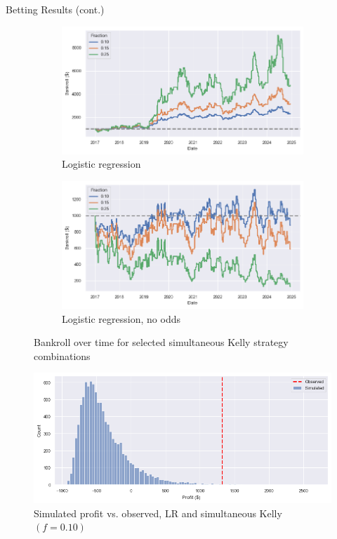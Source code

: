 \documentclass[aspectratio=169,xcolor=dvipsnames]{beamer}
\begin{document}
\begin{frame}{Betting Results (cont.)}
    \begin{figure}[!htb]
    \centering
    \captionsetup{justification=centering}
    \begin{subfigure}{.3\linewidth}
      \centering
      \includegraphics[width=\linewidth]{figures/bankroll_lr_simultaneous.png}
      \caption{Logistic regression}
    \end{subfigure}%
    \begin{subfigure}{.3\linewidth}
      \centering
      \includegraphics[width=\linewidth]{figures/bankroll_lr_no_odds_simultaneous.png}
      \caption{Logistic regression, no odds}
    \end{subfigure}
    \caption{Bankroll over time for selected simultaneous Kelly strategy combinations}
    \end{figure}

    \begin{figure}[!htb]
        \centering
        \includegraphics[width=.4\linewidth]{figures/mc_results.png}
        \caption{Simulated profit vs. observed, LR and simultaneous Kelly $(f = 0.10)$}
    \end{figure}
\end{frame}
\end{document}

